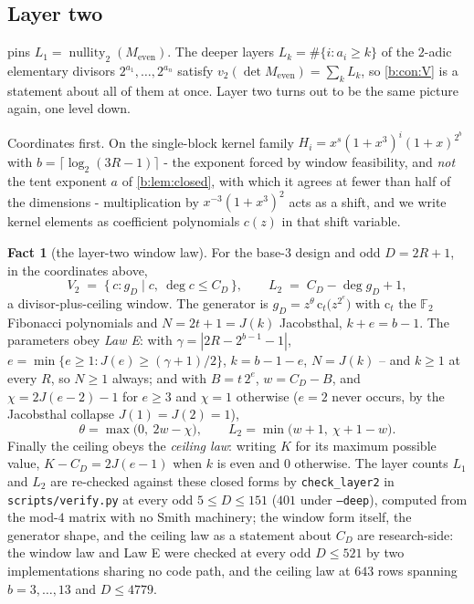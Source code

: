 \documentclass[11pt]{amsart}
\theoremstyle{definition}
\newtheorem{fact}[theorem]{Fact}
\theoremstyle{remark}
\begin{document}
\subsection*{Layer two}

 pins $L_1 = \operatorname{nullity}_2(M_{\mathrm{even}})$. The deeper layers $L_k = \#\{i : a_i \ge k\}$ of the $2$-adic elementary divisors $2^{a_1}, \dots, 2^{a_n}$ satisfy $v_2(\det M_{\mathrm{even}}) = \sum_k L_k$, so \cref{b:con:V} is a statement about all of them at once. Layer two turns out to be the same picture again, one level down.

Coordinates first. On the single-block kernel family $H_i = x^s(1+x^3)^i(1+x)^{2^b}$ with $b = \lceil \log_2(3R-1)\rceil$ - the exponent forced by window feasibility, and \emph{not} the tent exponent $a$ of \cref{b:lem:closed}, with which it agrees at fewer than half of the dimensions - multiplication by $x^{-3}(1+x^3)^2$ acts as a shift, and we write kernel elements as coefficient polynomials $c(z)$ in that shift variable.

\begin{fact}[the layer-two window law]
\label{b:fact:layer2}
For the base-$3$ design and odd $D = 2R+1$, in the coordinates above,
\[
  V_2 \;=\; \{\, c : g_D \mid c,\ \deg c \le C_D \,\},
  \qquad
  L_2 \;=\; C_D - \deg g_D + 1,
\]
a divisor-plus-ceiling window. The generator is $g_D = z^{\theta}\,\mathrm{c}_t\bigl(z^{2^e}\bigr)$ with $\mathrm{c}_t$ the $\mathbb{F}_2$ Fibonacci polynomials and $N = 2t+1 = J(k)$ Jacobsthal, $k + e = b-1$. The parameters obey \emph{Law E}: with $\gamma = |2R - 2^{b-1} - 1|$, $e = \min\{e \ge 1 : J(e) \ge (\gamma+1)/2\}$, $k = b-1-e$, $N = J(k)$ -- and $k \ge 1$ at every $R$, so $N \ge 1$ always; and with $B = t\,2^e$, $w = C_D - B$, and $\chi = 2J(e-2)-1$ for $e \ge 3$ and $\chi = 1$ otherwise ($e = 2$ never occurs, by the Jacobsthal collapse $J(1) = J(2) = 1$),
\[
  \theta = \max\bigl(0,\ 2w - \chi\bigr), \qquad L_2 = \min\bigl(w+1,\ \chi+1-w\bigr) .
\]
Finally the ceiling obeys the \emph{ceiling law}: writing $K$ for its maximum possible value, $K - C_D = 2J(e-1)$ when $k$ is even and $0$ otherwise. The layer counts $L_1$ and $L_2$ are re-checked against these closed forms by \texttt{check\_layer2} in \texttt{scripts/verify.py} at every odd $5 \le D \le 151$ ($401$ under \texttt{--deep}), computed from the mod-$4$ matrix with no Smith machinery; the window form itself, the generator shape, and the ceiling law as a statement about $C_D$ are research-side: the window law and Law E were checked at every odd $D \le 521$ by two implementations sharing no code path, and the ceiling law at $643$ rows spanning $b = 3,\dots,13$ and $D \le 4779$.
\end{fact}
\end{document}
